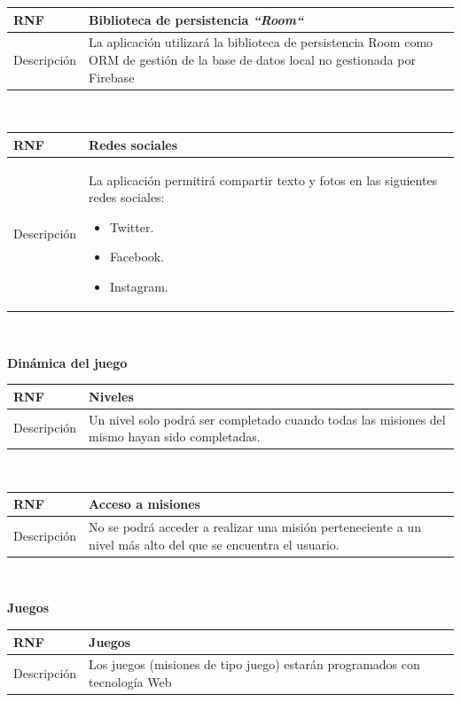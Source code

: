 \documentclass[twoside]{report}
\newcommand\addrow[2]{#1 &#2\\ }
\newcommand\addheading[2]{#1 &#2\\ \hline}
\newcommand\tabularhead{\begin{tabular}{lp{0.7\textwidth}}
\hline
}
\newenvironment{req}{\tabularhead}
{\hline\end{tabular}}
\begin{document}
\begin{req}
	\addheading{\textbf{RNF\arabic{nonFunctionalRequirements}}}{Biblioteca de persistencia \textit{“Room“}}
	\addrow{Descripción}{La aplicación utilizará \cite{roompersistence} la biblioteca de persistencia Room como ORM de gestión de la base de datos local no gestionada por Firebase}
\end{req}\\

\begin{req}
	\addheading{\textbf{RNF\arabic{nonFunctionalRequirements}}}{Redes sociales}
	\addrow{Descripción}{La aplicación permitirá compartir texto y fotos en las siguientes redes sociales:
	\begin{itemize}
	\item Twitter.
	\item Facebook.
	\item Instagram.
	\end{itemize}}
\end{req}\\

\textbf{Dinámica del juego}

\begin{req}
	\addheading{\textbf{RNF\arabic{nonFunctionalRequirements}}}{Niveles}
	\addrow{Descripción}{Un nivel solo podrá ser completado cuando todas las misiones del mismo hayan sido completadas.}
\end{req}\\

\begin{req}
	\addheading{\textbf{RNF\arabic{nonFunctionalRequirements}}}{Acceso a misiones}
	\addrow{Descripción}{No se podrá acceder a realizar una misión perteneciente a un nivel más alto del que se encuentra el usuario.}
\end{req}\\

\textbf{Juegos}\\

\begin{req}
	\addheading{\textbf{RNF\arabic{nonFunctionalRequirements}}}{Juegos}
	\addrow{Descripción}{Los juegos (misiones de tipo juego) estarán programados con tecnología Web}
\end{req}\\
\end{document}
